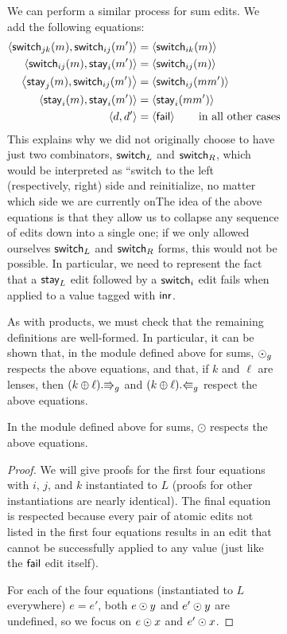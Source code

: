 \begin{figure}
\begin{figure}
We can perform a similar process for sum edits. We add the following
equations:
\begin{align*}
    \left<\mathsf{switch}_{jk}(m),\mathsf{switch}_{ij}(m')\right>
        &= \left<\mathsf{switch}_{ik}(m)\right> \\
    \left<\mathsf{switch}_{ij}(m),\mathsf{stay}_i(m')\right>
        &= \left<\mathsf{switch}_{ij}(m)\right> \\
    \left<\mathsf{stay}_j(m),\mathsf{switch}_{ij}(m')\right>
        &= \left<\mathsf{switch}_{ij}(mm')\right> \\
    \left<\mathsf{stay}_i(m),\mathsf{stay}_i(m')\right>
        &= \left<\mathsf{stay}_i(mm')\right> \\
    \left< d, d'\right>
        &= \left<\mathsf{fail}\right> \qquad \mbox{in all other cases}
\end{align*}
This explains why we did not originally choose to have just two combinators,
$\mathsf{switch}_L$ and $\mathsf{switch}_R$, which would be interpreted as ``switch to
the left (respectively, right) side and reinitialize, no matter which side
we are currently on\dotquote The idea of the above equations is that they allow
us to collapse any sequence of edits down into a single one; if we only
allowed ourselves $\mathsf{switch}_L$ and $\mathsf{switch}_R$ forms, this would not be
possible. In particular, we need to represent the fact that a $\mathsf{stay}_L$
edit followed by a $\mathsf{switch}_i$ edit fails when applied to a value tagged
with $\mathsf{inr}$.

As with products, we must check that the remaining
definitions are well-formed.  \iffull\else In particular, it can be shown that,
in the module defined above for sums, $\odot_g$ respects the above
equations, and that, if $k$ and $\ell$ are lenses, then
$(k\oplus\ell).\mathord{\Rrightarrow}_g$ and $(k\oplus\ell).\mathord{\Lleftarrow}_g$ respect the above
equations.  \fi

\iffull
\begin{lemma}
    In the module defined above for sums, $\odot$ respects the above
    equations.
\end{lemma}
\begin{proof}
    We will give proofs for the first four equations with $i$, $j$, and $k$
    instantiated to $L$ (proofs for other instantiations are nearly
    identical). The final equation is respected because every pair of atomic
    edits not listed in the first four equations results in an edit that
    cannot be successfully applied to any value (just like the $\mathsf{fail}$ edit
    itself).

    For each of the four equations (instantiated to $L$ everywhere) $e=e'$,
    both $e\odot y$ and $e'\odot y$ are undefined, so we focus
    on $e\odot x$ and $e'\odot x$.


\end{proof}
\end{figure}
\end{figure}
